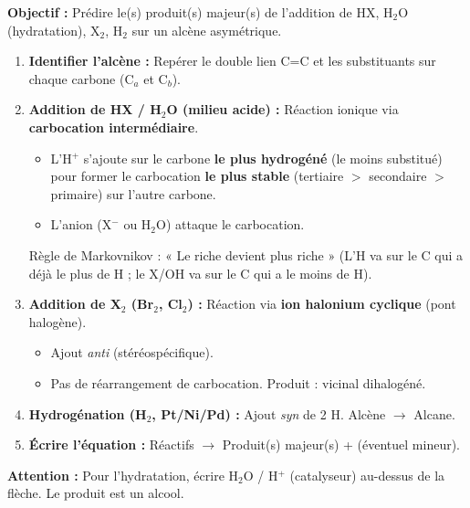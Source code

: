 \documentclass[11pt]{article}
\newcommand{\cle}[1]{{\popxbold\color{popdark}#1}}
\begin{document}
\begin{methode}
\textbf{Objectif :} Prédire le(s) produit(s) majeur(s) de l'addition de HX, H$_2$O (hydratation), X$_2$, H$_2$ sur un alcène asymétrique.

\begin{enumerate}
    \item \textbf{Identifier l'alcène :} Repérer le double lien C=C et les substituants sur chaque carbone (C$_a$ et C$_b$).
    \item \textbf{Addition de HX / H$_2$O (milieu acide) :} Réaction ionique via \textbf{carbocation intermédiaire}.
        \begin{itemize}
            \item L'H$^+$ s'ajoute sur le carbone \textbf{le plus hydrogéné} (le moins substitué) pour former le carbocation \textbf{le plus stable} (tertiaire $>$ secondaire $>$ primaire) sur l'autre carbone.
            \item L'anion (X$^-$ ou H$_2$O) attaque le carbocation.
        \end{itemize}
        \cle{Règle de Markovnikov :} « Le riche devient plus riche » (L'H va sur le C qui a déjà le plus de H ; le X/OH va sur le C qui a le moins de H).
    \item \textbf{Addition de X$_2$ (Br$_2$, Cl$_2$) :} Réaction via \textbf{ion halonium cyclique} (pont halogène). 
        \begin{itemize}
            \item Ajout \textit{anti} (stéréospécifique). 
            \item Pas de réarrangement de carbocation. Produit : vicinal dihalogéné.
        \end{itemize}
    \item \textbf{Hydrogénation (H$_2$, Pt/Ni/Pd) :} Ajout \textit{syn} de 2 H. Alcène $\rightarrow$ Alcane.
    \item \textbf{Écrire l'équation :} Réactifs $\rightarrow$ Produit(s) majeur(s) + (éventuel mineur).
\end{enumerate}
\textbf{Attention :} Pour l'hydratation, écrire H$_2$O / H$^+$ (catalyseur) au-dessus de la flèche. Le produit est un alcool.
\end{methode}
\end{document}
